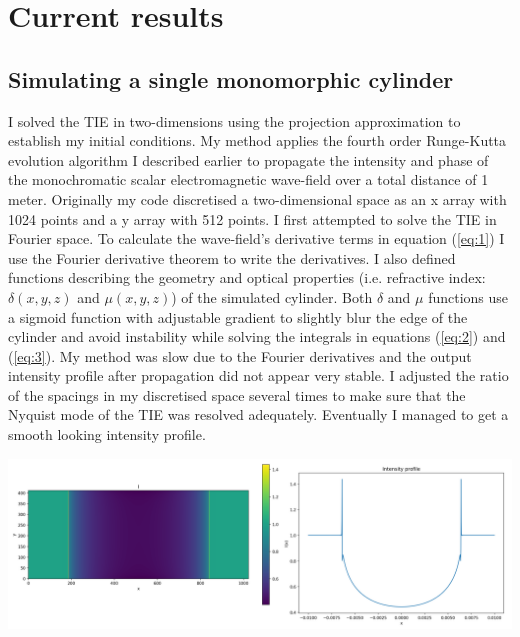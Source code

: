 \documentclass[9pt, a4paper]{article}
\newenvironment{Figure}
    {\par\medskip\noindent\minipage{\linewidth}}
    {\endminipage\par\medskip}
\begin{document}
\section{Current results}
\subsection{Simulating a single monomorphic cylinder}
I solved the TIE in two-dimensions using the projection approximation to establish my initial conditions. My method applies the fourth order Runge-Kutta evolution algorithm I described earlier to propagate the intensity and phase of the monochromatic scalar electromagnetic wave-field over a total distance of 1 meter. Originally my code discretised a two-dimensional space as an x array with 1024 points and a y array with 512 points. I first attempted to solve the TIE in Fourier space. To calculate the wave-field's derivative terms in equation (\ref{eq:1}) I use the Fourier derivative theorem to write the derivatives. I also defined functions describing the geometry and optical properties (i.e. refractive index: $\delta(x, y, z)$ and $\mu(x, y, z)$) of the simulated cylinder. Both $\delta$ and $\mu$ functions use a sigmoid function with adjustable gradient to slightly blur the edge of the cylinder and avoid instability while solving the integrals in equations (\ref{eq:2}) and (\ref{eq:3}). My method was slow due to the Fourier derivatives and the output intensity profile after propagation did not appear very stable. I adjusted the ratio of the spacings in my discretised space several times to make sure that the Nyquist mode of the TIE was resolved adequately. Eventually I managed to get a smooth looking intensity profile.
\begin{Figure}
\centering
\includegraphics[width=\linewidth]{Fourier_intensity_profile.pdf}
\end{Figure}
\end{document}
